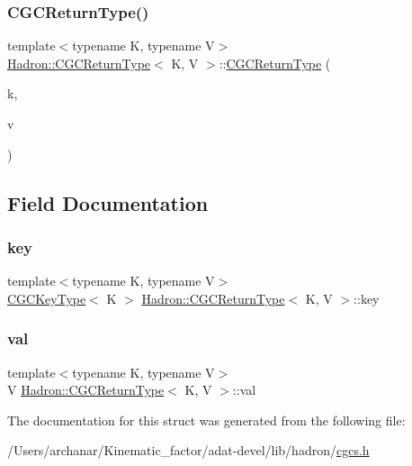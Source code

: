 \subsubsection{\texorpdfstring{CGCReturnType()}{CGCReturnType()}\hspace{0.1cm}{\footnotesize\ttfamily [6/6]}}
{\footnotesize\ttfamily template$<$typename K, typename V$>$ \\
\mbox{\hyperlink{structHadron_1_1CGCReturnType}{Hadron\+::\+C\+G\+C\+Return\+Type}}$<$ K, V $>$\+::\mbox{\hyperlink{structHadron_1_1CGCReturnType}{C\+G\+C\+Return\+Type}} (\begin{DoxyParamCaption}\item[{const \mbox{\hyperlink{structHadron_1_1CGCKeyType}{C\+G\+C\+Key\+Type}}$<$ K $>$ \&}]{k,  }\item[{const V \&}]{v }\end{DoxyParamCaption})\hspace{0.3cm}{\ttfamily [inline]}}



\subsection{Field Documentation}
\mbox{\label{structHadron_1_1CGCReturnType_a1101bfc0c0d7cd166d32992058e4aa6c}} 
\subsubsection{\texorpdfstring{key}{key}}
{\footnotesize\ttfamily template$<$typename K, typename V$>$ \\
\mbox{\hyperlink{structHadron_1_1CGCKeyType}{C\+G\+C\+Key\+Type}}$<$ K $>$ \mbox{\hyperlink{structHadron_1_1CGCReturnType}{Hadron\+::\+C\+G\+C\+Return\+Type}}$<$ K, V $>$\+::key}

\mbox{\label{structHadron_1_1CGCReturnType_ae84be939a57b9598ac24e018e399cc38}} 
\subsubsection{\texorpdfstring{val}{val}}
{\footnotesize\ttfamily template$<$typename K, typename V$>$ \\
V \mbox{\hyperlink{structHadron_1_1CGCReturnType}{Hadron\+::\+C\+G\+C\+Return\+Type}}$<$ K, V $>$\+::val}



The documentation for this struct was generated from the following file\+:\begin{DoxyCompactItemize}
\item 
/\+Users/archanar/\+Kinematic\+\_\+factor/adat-\/devel/lib/hadron/\mbox{\hyperlink{adat-devel_2lib_2hadron_2cgcs_8h}{cgcs.\+h}}\end{DoxyCompactItemize}
